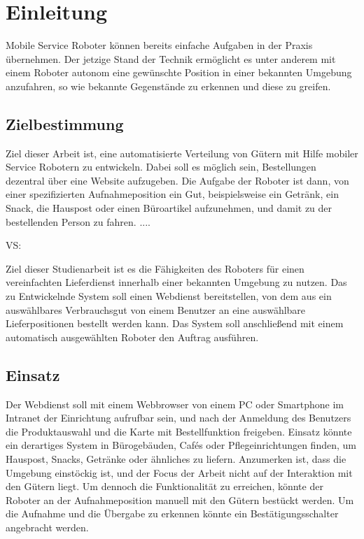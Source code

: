 %
%
\chapter{Einleitung} \label{Kap:2}

Mobile Service Roboter können bereits einfache Aufgaben in der Praxis übernehmen.
Der jetzige Stand der Technik ermöglicht es unter anderem mit einem Roboter autonom eine gewünschte Position in einer bekannten Umgebung anzufahren,
so wie bekannte Gegenstände zu erkennen und diese zu greifen.
\section{Zielbestimmung}
\vspace{0pt}
Ziel dieser Arbeit ist, eine automatisierte Verteilung von Gütern mit Hilfe mobiler Service Robotern zu entwickeln.
Dabei soll es möglich sein, Bestellungen dezentral über eine Website aufzugeben.
Die Aufgabe der Roboter ist dann, von einer spezifizierten Aufnahmeposition ein Gut, beispielsweise ein Getränk, ein Snack, die Hauspost oder einen Büroartikel aufzunehmen,
und damit zu der bestellenden Person zu fahren. ....

VS:

Ziel dieser Studienarbeit ist es die Fähigkeiten des Roboters für einen vereinfachten Lieferdienst innerhalb einer bekannten Umgebung zu nutzen.
Das zu Entwickelnde System soll einen Webdienst bereitstellen, von dem aus ein auswählbares Verbrauchsgut von einem Benutzer an eine auswählbare Lieferpositionen bestellt werden kann.
Das System soll anschließend mit einem automatisch ausgewählten Roboter den Auftrag ausführen.
\section{Einsatz}
Der Webdienst soll mit einem Webbrowser von einem PC oder Smartphone im Intranet der Einrichtung aufrufbar sein, und nach der Anmeldung des Benutzers die Produktauswahl und die Karte mit Bestellfunktion freigeben.
Einsatz könnte ein derartiges System in Bürogebäuden, Cafés oder Pflegeinrichtungen finden, um Hauspost, Snacks, Getränke oder ähnliches zu liefern.
Anzumerken ist, dass die Umgebung einstöckig ist, und der Focus der Arbeit nicht auf der Interaktion mit den Gütern liegt.
Um dennoch die Funktionalität zu erreichen, könnte der Roboter an der Aufnahmeposition manuell mit den Gütern bestückt werden.
Um die Aufnahme und die Übergabe zu erkennen könnte ein Bestätigungsschalter angebracht werden.
